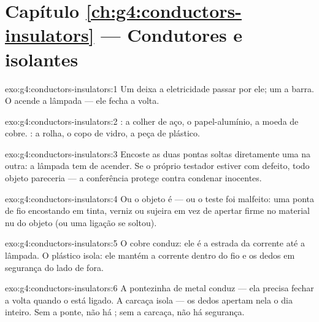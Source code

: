 \section*{Capítulo \ref{ch:g4:conductors-insulators} --- Condutores e isolantes}

\begin{solution}{exo:g4:conductors-insulators:1}
Um  deixa a eletricidade passar por ele; um  a barra.
O  acende a lâmpada --- ele fecha a volta.
\end{solution}

\begin{solution}{exo:g4:conductors-insulators:2}
: a colher de aço, o papel-alumínio, a moeda de cobre.
: a rolha, o copo de vidro, a peça de plástico.
\end{solution}

\begin{solution}{exo:g4:conductors-insulators:3}
Encoste as duas pontas soltas diretamente uma na outra: a lâmpada
tem de acender. Se o próprio testador estiver com defeito, todo
objeto pareceria  --- a conferência protege contra condenar
inocentes.
\end{solution}

\begin{solution}{exo:g4:conductors-insulators:4}
Ou o objeto é  --- ou o teste foi malfeito: uma ponta de fio
encostando em tinta, verniz ou sujeira em vez de apertar firme no
material nu do objeto (ou uma ligação se soltou).
\end{solution}

\begin{solution}{exo:g4:conductors-insulators:5}
O cobre conduz: ele é a estrada da corrente até a lâmpada. O plástico
isola: ele mantém a corrente dentro do fio e os dedos em segurança
do lado de fora.
\end{solution}

\begin{solution}{exo:g4:conductors-insulators:6}
A pontezinha de metal conduz --- ela precisa fechar a volta quando o
 está ligado. A carcaça isola --- os dedos apertam nela o
dia inteiro. Sem a ponte, não há ; sem a carcaça, não há
segurança.
\end{solution}

